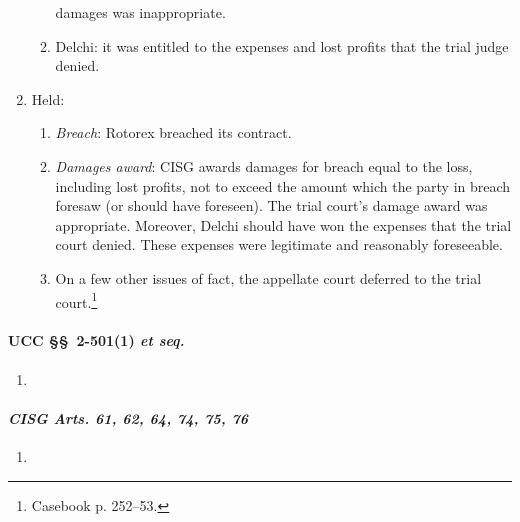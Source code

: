 \begin{enumerate}
\begin{enumerate}
        damages was inappropriate.
        \item Delchi: it was entitled to the expenses and lost profits that 
        the trial judge denied.
    \end{enumerate}
    \item Held:
    \begin{enumerate}
        \item \emph{Breach}: Rotorex breached its contract.
        \item \emph{Damages award}: CISG awards damages for breach equal to 
        the loss, including lost profits, not to exceed the amount which the 
        party in breach foresaw (or should have foreseen). The trial court's 
        damage award was appropriate. Moreover, Delchi should have won the 
        expenses that the trial court denied. These expenses were legitimate 
        and reasonably foreseeable.
        \item On a few other issues of fact, the appellate court deferred to 
        the trial court.\footnote{Casebook p. 252--53.}
    \end{enumerate}
\end{enumerate}

\paragraph{UCC \S\S\ 2-501(1) \emph{et seq.}}

\begin{enumerate}
    \item %
\end{enumerate}

\paragraph{\emph{CISG Arts. 61, 62, 64, 74, 75, 76}}

\begin{enumerate}
    \item %
\end{enumerate}

